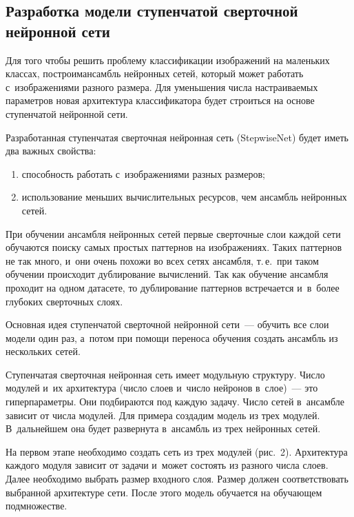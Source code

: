\begin{multicols}{2}
\section{Разработка модели ступенчатой сверточной нейронной сети}

  
  Для того чтобы решить проблему классификации изображений на маленьких 
классах, построим\linebreak ан\-самбль нейронных сетей, который может работать 
с~изображениями разного размера. Для уменьшения числа настраиваемых 
па\-ра\-мет\-ров новая архитектура классификатора будет строиться на \mbox{основе} 
ступенчатой нейронной сети.
  
  Разработанная ступенчатая сверточная нейронная сеть (StepwiseNet) будет 
иметь два важ\-ных свойства:
  \begin{enumerate}[(1)]
  \item способность работать с~изображениями разных размеров;
  \item использование меньших вы\-чис\-ли\-тель\-ных ресурсов, чем ан\-самбль 
нейронных сетей.
  \end{enumerate}
  
  При обучении ан\-самбля нейронных сетей первые сверточные слои каж\-дой 
сети обуча\-ют\-ся поиску самых простых паттернов на изображениях. Таких 
паттернов не так много, и~они очень похожи во всех сетях ан\-самб\-ля, т.\,е.\ при 
таком обуче\-нии происходит дуб\-ли\-ро\-ва\-ние вы\-чис\-ле\-ний. Так как обучение 
ансамбля проходит на одном датасете, то дуб\-ли\-ро\-ва\-ние паттернов встречается 
и~в~более глубоких сверточных слоях.
  
  Основная идея ступенчатой сверточной нейронной сети~--- \mbox{обучить} все слои 
модели один раз, а~потом при помощи переноса обучения создать ансамбль из 
нескольких сетей.
  
  Ступенчатая сверточная нейронная сеть имеет модульную структуру. Чис\-ло 
модулей и~их архитектура (чис\-ло слоев и~чис\-ло нейронов в~слое)~--- это 
гиперпараметры. Они подбираются под каж\-дую задачу. Чис\-ло сетей в~ан\-самб\-ле 
зависит от числа модулей. Для примера создадим модель из трех модулей. 
В~дальнейшем она будет развернута в~ан\-самбль из трех нейронных сетей.
  
  На первом этапе необходимо создать сеть из трех модулей (рис.~2). 
Архитектура каждого модуля зависит от задачи и~может со\-сто\-ять из разного 
чис\-ла слоев. Далее необходимо вы\-брать размер входного слоя. Размер должен 
соответствовать выбранной архитектуре сети. После этого модель обуча\-ет\-ся на 
обуча\-ющем подмножестве.



\end{multicols}
